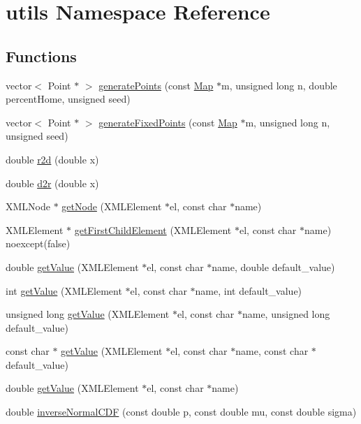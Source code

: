 \hypertarget{namespaceutils}{}\section{utils Namespace Reference}
\label{namespaceutils}
\subsection*{Functions}
\begin{DoxyCompactItemize}
\item 
vector$<$ Point $\ast$ $>$ \hyperlink{namespaceutils_a16e957d5c26b39c840f6e109dd19d45d}{generate\+Points} (const \hyperlink{class_map}{Map} $\ast$m, unsigned long n, double percent\+Home, unsigned seed)
\item 
vector$<$ Point $\ast$ $>$ \hyperlink{namespaceutils_acd746b43155fa3033001f28a91a71cec}{generate\+Fixed\+Points} (const \hyperlink{class_map}{Map} $\ast$m, unsigned long n, unsigned seed)
\item 
double \hyperlink{namespaceutils_af70f6f3c2ac66aa3b4ce64a3b48288cb}{r2d} (double x)
\item 
double \hyperlink{namespaceutils_a1d747e438d856e6c46cd1fe558fe3821}{d2r} (double x)
\item 
X\+M\+L\+Node $\ast$ \hyperlink{namespaceutils_a707d0fc1b0346b7da16a6f7714a7f24d}{get\+Node} (X\+M\+L\+Element $\ast$el, const char $\ast$name)
\item 
X\+M\+L\+Element $\ast$ \hyperlink{namespaceutils_a929f9a6daaf5e504356ea4af5918c34b}{get\+First\+Child\+Element} (X\+M\+L\+Element $\ast$el, const char $\ast$name) noexcept(false)
\item 
double \hyperlink{namespaceutils_a90cdccb9260004c67a61003d648b4e14}{get\+Value} (X\+M\+L\+Element $\ast$el, const char $\ast$name, double default\+\_\+value)
\item 
int \hyperlink{namespaceutils_a50983d6cf6c443990ee6d15d8082f2c7}{get\+Value} (X\+M\+L\+Element $\ast$el, const char $\ast$name, int default\+\_\+value)
\item 
unsigned long \hyperlink{namespaceutils_aa81758518e26568880b7d74dc182c75d}{get\+Value} (X\+M\+L\+Element $\ast$el, const char $\ast$name, unsigned long default\+\_\+value)
\item 
const char $\ast$ \hyperlink{namespaceutils_ad69ebe54599ec891b3053cf9f5a1bd63}{get\+Value} (X\+M\+L\+Element $\ast$el, const char $\ast$name, const char $\ast$default\+\_\+value)
\item 
double \hyperlink{namespaceutils_a7347b1fde0bc9f313cd0a7051c33818a}{get\+Value} (X\+M\+L\+Element $\ast$el, const char $\ast$name)
\item 
double \hyperlink{namespaceutils_a58e0276c0ed6bb5e30e35568f1006af4}{inverse\+Normal\+C\+DF} (const double p, const double mu, const double sigma)
\end{DoxyCompactItemize}
